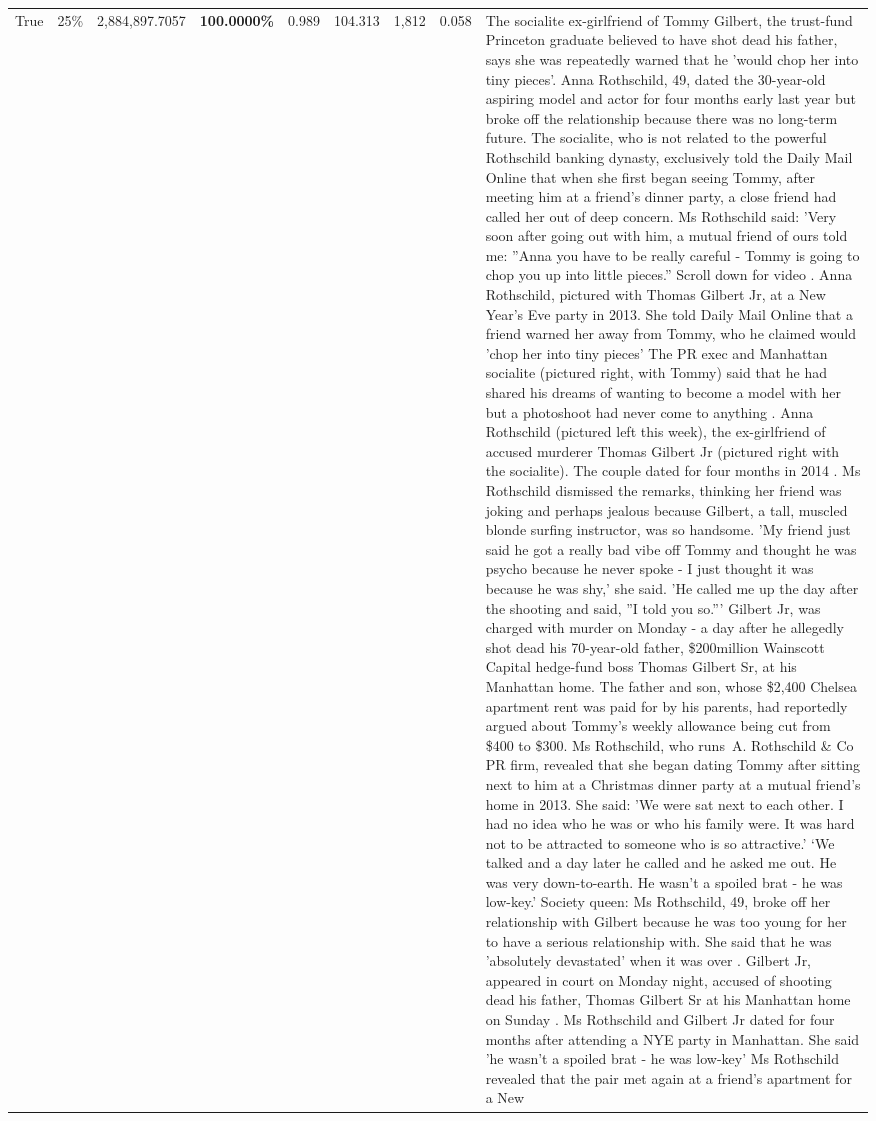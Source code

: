 \begin{table}[H]
\begin{tabular}{lllrlllll}
True & 25\% & 2,884,897.7057 & \bfseries \color{red} 100.0000\% & 0.989 & 104.313 & 1,812 & 0.058 & The socialite ex-girlfriend of Tommy Gilbert, the trust-fund Princeton graduate believed to have shot dead his father, says she was repeatedly warned that he 'would chop her into tiny pieces'. Anna Rothschild, 49, dated the 30-year-old aspiring model and actor for four months early last year but broke off the relationship because there was no long-term future. The socialite, who is not related to the powerful Rothschild banking dynasty, exclusively told the Daily Mail Online that when she first began seeing Tommy, after meeting him at a friend's dinner party, a close friend had called her out of deep concern. Ms Rothschild said: 'Very soon after going out with him, a mutual friend of ours told me: ''Anna you have to be really careful - Tommy is going to chop you up into little pieces.'' Scroll down for video . Anna Rothschild, pictured with Thomas Gilbert Jr, at a New Year's Eve party in 2013. She told Daily Mail Online that a friend warned her away from Tommy, who he claimed would 'chop her into tiny pieces' The PR exec and Manhattan socialite (pictured right, with Tommy) said that he had shared his dreams of wanting to become a model with her but a photoshoot had never come to anything . Anna Rothschild (pictured left this week), the ex-girlfriend of accused murderer Thomas Gilbert Jr (pictured right with the socialite). The couple dated for four months in 2014 . Ms Rothschild dismissed the remarks, thinking her friend was joking and perhaps jealous because Gilbert, a tall, muscled blonde surfing instructor, was so handsome. 'My friend just said he got a really bad vibe off Tommy and thought he was psycho because he never spoke - I just thought it was because he was shy,' she said. 'He called me up the day after the shooting and said, ''I told you so.''' Gilbert Jr, was charged with murder on Monday - a day after he allegedly shot dead his 70-year-old father, \$200million Wainscott Capital hedge-fund boss Thomas Gilbert Sr, at his Manhattan home. The father and son, whose \$2,400 Chelsea apartment rent was paid for by his parents, had reportedly argued about Tommy's weekly allowance being cut from \$400 to \$300. Ms Rothschild, who runs A. Rothschild \& Co PR firm, revealed that she began dating Tommy after sitting next to him at a Christmas dinner party at a mutual friend's home in 2013. She said: 'We were sat next to each other. I had no idea who he was or who his family were. It was hard not to be attracted to someone who is so attractive.' ‘We talked and a day later he called and he asked me out. He was very down-to-earth. He wasn’t a spoiled brat - he was low-key.’ Society queen: Ms Rothschild, 49, broke off her relationship with Gilbert because he was too young for her to have a serious relationship with. She said that he was 'absolutely devastated' when it was over . Gilbert Jr, appeared in court on Monday night, accused of shooting dead his father, Thomas Gilbert Sr at his Manhattan home on Sunday . Ms Rothschild and Gilbert Jr dated for four months after attending a NYE party in Manhattan. She said 'he wasn't a spoiled brat - he was low-key' Ms Rothschild revealed that the pair met again at a friend’s apartment for a New 
\end{tabular}
\end{table}
